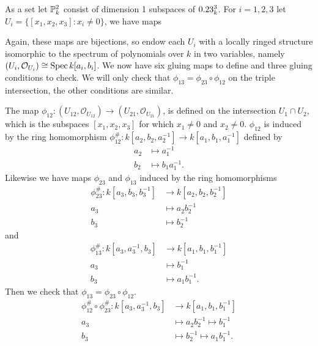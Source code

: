 As a set let $\P_k^2$ consist of dimension 1 subspaces of $\A_k^3$. For $i = 1,2,3$ let $U_i = \{[x_1, x_2, x_3] \colon x_i \ne 0\}$, we have maps
\begin{center}
\end{center}
Again, these maps are bijections, so endow each $U_i$ with a locally ringed structure isomorphic to the spectrum of polynomials over $k$ in two variables, namely $(U_i, \mathcal{O}_{U_i}) \cong \Spec k[a_i, b_i]$.
We now have six gluing maps to define and three gluing conditions to check. We will only check that $\phi_{13} = \phi_{23} \circ \phi_{12}$ on the triple intersection, the other conditions are similar.

The map $\phi_{12} \colon (U_{12}, \mathcal{O}_{U_{12}}) \to (U_{21}, \mathcal{O}_{U_{21}})$, is defined on the intersection $U_1 \cap U_2$, which is the subspaces $[x_1, x_2, x_3]$ for which $x_1 \ne 0$ and $x_2 \ne 0$. $\phi_{12}$ is induced by the ring homomorphism $\phi_{12}^\# \colon k[a_2, b_2, a_2^{-1}] \to k[a_1, b_1, a_1^{-1}]$ defined by
\begin{align*}
a_2 &\mapsto a_1^{-1}\\
b_2 &\mapsto b_1 a_1^{-1}.
\end{align*}
Likewise we have maps $\phi_{23}$ and $\phi_{13}$ induced by the ring homomorphisms
\begin{align*}
\phi_{23}^\# \colon k[a_3, b_3, b_3^{-1}] &\to k[a_2, b_2, b_2^{-1}]\\
a_3 &\mapsto a_2 b_2^{-1}\\
b_3 &\mapsto b_2^{-1}
\end{align*}
and
\begin{align*}
\phi_{13}^\# \colon k[a_3, a_3^{-1}, b_3] &\to k[a_1, b_1, b_1^{-1}]\\
a_3 &\mapsto b_1^{-1}\\
b_3 &\mapsto a_1 b_1^{-1}.
\end{align*}
Then we check that $\phi_{13} = \phi_{23} \circ \phi_{12}$.
\begin{align*}
\phi_{12}^\# \circ \phi_{23}^\# \colon k[a_3, a_3^{-1}, b_3] &\to k[a_1, b_1, b_1^{-1}]\\
a_3 &\mapsto a_2b_2^{-1} \mapsto b_1^{-1}\\
b_3 &\mapsto b_2^{-1} \mapsto a_1 b_1^{-1}.
\end{align*}

